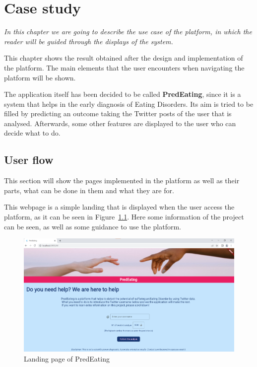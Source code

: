 \chapter{Case study}

\label{chap:case-study}

\textit{In this chapter we are going to describe the use case of the platform, in which the reader will be guided through the displays of the system.}

\clearpage

This chapter shows the result obtained after the design and implementation of the platform. The main elements that the user encounters when navigating the platform will be shown. 

The application itself has been decided to be called \textbf{PredEating}, since it is a system that helps in the early diagnosis of Eating Disorders. Its aim is tried to be filled by predicting an outcome taking the Twitter posts of the user that is analysed. Afterwards, some other features are displayed to the user who can decide what to do.

\section{User flow}

This section will show the pages implemented in the platform as well as their parts, what can be done in them and what they are for.

This webpage is a simple landing that is displayed when the user access the platform, as it can be seen in Figure~\ref{fig:landing}. Here some information of the project can be seen, as well as some guidance to use the platform.


\begin{figure}[!htp]
    \centering
    \includegraphics[scale=0.4]{img/case/landing.png}
    \caption{Landing page of PredEating}
    \label{fig:landing}
\end{figure}

